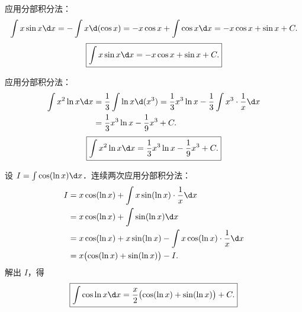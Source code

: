 \begin{solution}

    应用分部积分法：
    \begin{equation}
        \int x \sin x \d x = -\int x \d(\cos x) = -x \cos x + \int \cos x \d x = -x \cos x + \sin x + C.
    \end{equation}
    \begin{equation}
        \boxed{\int x \sin x \d x = -x \cos x + \sin x + C.}
    \end{equation}


    应用分部积分法：
    \begin{equation}
        \begin{aligned}
            \int x^2 \ln x \d x & = \frac{1}{3}\int \ln x \d(x^3) = \frac{1}{3}x^3 \ln x - \frac{1}{3}\int x^3 \cdot \frac{1}{x} \d x \\
                                & = \frac{1}{3}x^3 \ln x - \frac{1}{9}x^3 + C.
        \end{aligned}
    \end{equation}
    \begin{equation}
        \boxed{\int x^2 \ln x \d x = \frac{1}{3}x^3 \ln x - \frac{1}{9}x^3 + C.}
    \end{equation}


    设 $I = \int \cos(\ln x) \d x$．连续两次应用分部积分法：
    \begin{equation}
        \begin{aligned}
            I & = x \cos(\ln x) + \int x \sin(\ln x) \cdot \frac{1}{x} \d x                 \\
              & = x \cos(\ln x) + \int \sin(\ln x) \d x                                     \\
              & = x \cos(\ln x) + x \sin(\ln x) - \int x \cos(\ln x) \cdot \frac{1}{x} \d x \\
              & = x \bigl( \cos(\ln x) + \sin(\ln x) \bigr) - I.
        \end{aligned}
    \end{equation}
    解出 $I$，得
    \begin{equation}
        \boxed{\int \cos \ln x \d x = \frac{x}{2}\bigl( \cos(\ln x) + \sin(\ln x) \bigr) + C.}
    \end{equation}



\end{solution}
